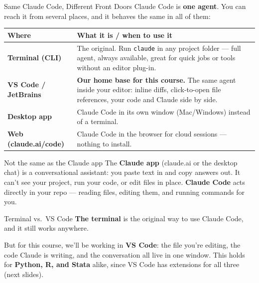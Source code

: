 \documentclass[aspectratio=169, 11pt]{beamer}
\begin{document}
\begin{frame}{Same Claude Code, Different Front Doors}
  \small
  Claude Code is \textbf{one agent}. You can reach it from several places, and it behaves the same in all of them:

  \vspace{0.4em}
  \begin{tabular}{@{}p{} p{}@{}}
    \toprule
    \textbf{Where} & \textbf{What it is / when to use it} \\
    \midrule
    \textbf{Terminal (CLI)} & The original. Run \lstinline{claude} in any project folder --- full agent, always available, great for quick jobs or tools without an editor plug-in. \\[0.3em]
    \textbf{VS Code / JetBrains} & \textbf{Our home base for this course.} The same agent inside your editor: inline diffs, click-to-open file references, your code and Claude side by side. \\[0.3em]
    \textbf{Desktop app} & Claude Code in its own window (Mac/Windows) instead of a terminal. \\[0.3em]
    \textbf{Web (claude.ai/code)} & Claude Code in the browser for cloud sessions --- nothing to install. \\
    \bottomrule
  \end{tabular}

  \vspace{0.5em}
  \begin{alertblock}{Not the same as the Claude app}
    The \textbf{Claude app} (claude.ai or the desktop chat) is a conversational assistant: you paste text in and copy answers out. It can't see your project, run your code, or edit files in place. \textbf{Claude Code} acts directly in your repo --- reading files, editing them, and running commands for you.
  \end{alertblock}
\end{frame}

\begin{frame}{Terminal vs.\ VS Code}
  \textbf{The terminal} is the original way to use Claude Code, and it still works anywhere.

  \vspace{0.6em}
  But for this course, we'll be working in \textbf{VS Code}: the file you're editing, the code Claude is writing, and the conversation all live in one window. This holds for \textbf{Python, R, and Stata} alike, since VS Code has extensions for all three (next slides).
\end{frame}
\end{document}
